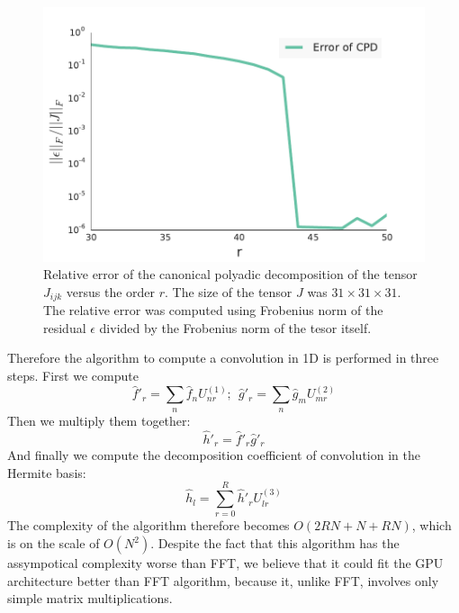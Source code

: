 \begin{figure}[ht!]
\label{pic: CPDError}
\includegraphics[width=1\textwidth]{Hermite/Fig/CPDError.pdf}
\caption{Relative error of the canonical polyadic decomposition of the tensor $J_{ijk}$ versus the order $r$. 
The size of the tensor $J$ was $31\times 31\times 31$. The relative error was computed using Frobenius norm 
of the residual $\epsilon$ divided by the Frobenius norm of the tesor itself.}
\end{figure}

Therefore the algorithm to compute a convolution in 1D is performed in three steps. First we compute 
\begin{equation}
 \hat{f}'_r=\sum_{n}\hat{f}_n U^{(1)}_{nr};~~
 \hat{g}'_r=\sum_{n}\hat{g}_m U^{(2)}_{mr}
\end{equation}
Then we multiply them together:
\begin{equation}
 \hat{h}'_r=\hat{f}'_r\hat{g}'_r
\end{equation}
And finally we compute the decomposition coefficient of convolution in the Hermite basis:
\begin{equation}
 \hat{h}_l = \sum_{r=0}^{R} \hat{h}'_r U^{(3)}_{lr}
\end{equation}
The complexity of the algorithm therefore becomes $O(2RN + N + RN)$, which is on the scale of $O(N^2)$. Despite the fact that this algorithm has the assympotical
complexity worse than FFT, we believe that it could fit the GPU architecture better than FFT algorithm, because it, unlike FFT,
involves only simple matrix multiplications.